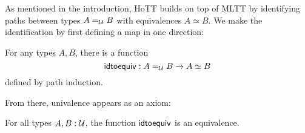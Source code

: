 \documentclass[main.tex]{subfiles}
\begin{document}
As mentioned in the introduction, HoTT builds on top of MLTT by identifying paths between types $A =_{\mathcal{U}} B$ with equivalences $A \simeq B$. We make the identification by first defining a map in one direction:

\begin{lemma}
    For any types $A,B$, there is a function
    $$\mathsf{idtoequiv} : A =_{\mathcal{U}} B \to A \simeq B$$
    defined by path induction.
\end{lemma}

From there, univalence appears as an axiom:

\begin{axiom}
    For all types $A,B : \mathcal{U}$, the function $\mathsf{idtoequiv}$ is an equivalence.
\end{axiom}
\end{document}
